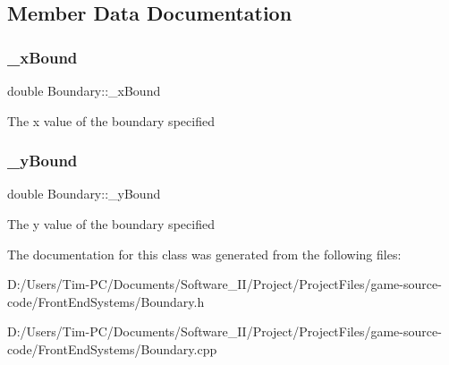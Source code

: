 \subsection{Member Data Documentation}
\mbox{\label{class_boundary_a55685a68cc9b709898bdbe632d2dfeec}} 
\subsubsection{\texorpdfstring{\+\_\+x\+Bound}{\_xBound}}
{\footnotesize\ttfamily double Boundary\+::\+\_\+x\+Bound\hspace{0.3cm}{\ttfamily [private]}}

The x value of the boundary specified \mbox{\label{class_boundary_a709e9e1f24faec6d4a35b50e6faffb8e}} 
\subsubsection{\texorpdfstring{\+\_\+y\+Bound}{\_yBound}}
{\footnotesize\ttfamily double Boundary\+::\+\_\+y\+Bound\hspace{0.3cm}{\ttfamily [private]}}

The y value of the boundary specified 

The documentation for this class was generated from the following files\+:\begin{DoxyCompactItemize}
\item 
D\+:/\+Users/\+Tim-\/\+P\+C/\+Documents/\+Software\+\_\+\+I\+I/\+Project/\+Project\+Files/game-\/source-\/code/\+Front\+End\+Systems/Boundary.\+h\item 
D\+:/\+Users/\+Tim-\/\+P\+C/\+Documents/\+Software\+\_\+\+I\+I/\+Project/\+Project\+Files/game-\/source-\/code/\+Front\+End\+Systems/Boundary.\+cpp\end{DoxyCompactItemize}

